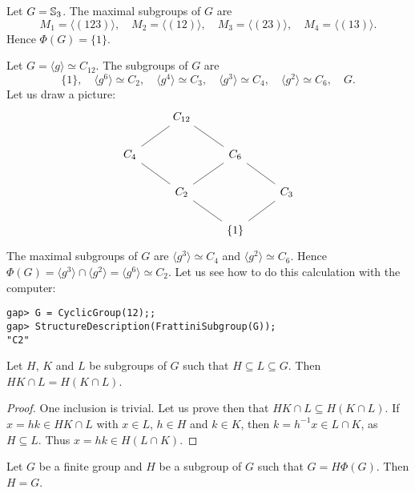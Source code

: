 \begin{example}
Let $G=\mathbb{S}_3$. The maximal subgroups of $G$ are 
\[
M_1=\langle (123)\rangle,
\quad
M_2=\langle (12)\rangle,
\quad
M_3=\langle (23)\rangle,
\quad
M_4=\langle (13)\rangle.
\]
Hence $\Phi(G)=\{1\}$. 
\end{example}

\begin{example}
Let $G=\langle g\rangle\simeq C_{12}$. The subgroups of $G$ are 
\[
\{1\},\quad
\langle g^6\rangle\simeq C_2,\quad
\langle g^4\rangle\simeq C_3,\quad
\langle g^3\rangle\simeq C_4,\quad
\langle g^2\rangle\simeq C_6,\quad
G.
\]
Let us draw a picture:
\[\begin{tikzcd}
	& {C_{12}} \\
	{C_4} && {C_6} \\
	& {C_2} && {C_3} \\
	&& {\{1\}}
	\arrow[no head, from=4-3, to=3-2]
	\arrow[no head, from=4-3, to=3-4]
	\arrow[no head, from=3-4, to=2-3]
	\arrow[no head, from=2-3, to=1-2]
	\arrow[no head, from=3-2, to=2-1]
	\arrow[no head, from=2-1, to=1-2]
	\arrow[no head, from=3-2, to=2-3]
\end{tikzcd}\]
The maximal subgroups of $G$ are 
$\langle g^3\rangle\simeq C_4$ and $\langle
g^2\rangle\simeq C_6$. Hence $\Phi(G)=\langle g^3\rangle\cap \langle
g^2\rangle=\langle g^6\rangle\simeq C_2$. 
Let us see how to do this calculation with the computer:
\begin{lstlisting}
gap> G = CyclicGroup(12);;
gap> StructureDescription(FrattiniSubgroup(G));
"C2"
\end{lstlisting} 
\end{example}

\begin{lemma}[Dedekind]
\label{lem:Dedekind}
Let $H$, $K$ and $L$ be subgroups of $G$ 
such that $H\subseteq L\subseteq G$. Then 
$HK\cap L=H(K\cap L)$.
\end{lemma}

\begin{proof}
One inclusion is trivial. Let us prove then that 
$HK\cap L\subseteq H(K\cap L)$. If 
$x=hk\in HK\cap L$ with $x\in L$, $h\in H$ and $k\in K$, then 
$k=h^{-1}x\in L\cap K$, as $H\subseteq L$. Thus $x=hk\in H(L\cap
	K)$.
\end{proof}

\begin{lemma}
\label{lem:G=HPhi(G)}
Let $G$ be a finite group and $H$ be a subgroup of $G$ such that 
$G=H\Phi(G)$. Then $H=G$.
\end{lemma}

